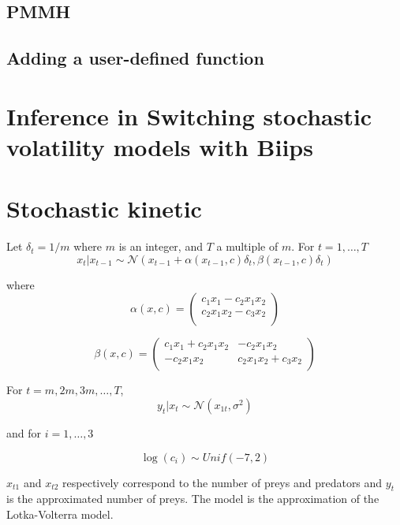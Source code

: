 \documentclass[article,shortnames]{jss}
\begin{document}
\subsection{PMMH}


\subsection{Adding a user-defined function}






\section{Inference in Switching stochastic volatility models with Biips}
\label{sec:switchingstochasticvolatility}



\section{Stochastic kinetic}
Let $\delta_t=1/m$ where $m$ is an integer, and $T$ a multiple of $m$.
For $t=1,\ldots,T$
$$ x_t|x_{t-1}\sim \mathcal N(x_{t-1}+\alpha(x_{t-1},c)\delta_t,\beta(x_{t-1},c)\delta_t)$$

where $$\alpha(x,c) = \left(
                  \begin{array}{c}
                    c_1x_1-c_2x_1x_2  \\
                    c_2x_1x_2-c_3x_2 \\
                  \end{array}
                \right)$$

     $$\beta(x,c) = \left(
                  \begin{array}{cc}
                    c_1x_1+c_2x_1x_2 & -c_2x_1x_2\\
                    -c_2x_1x_2 & c_2x_1x_2 + c_3x_2 \\
                  \end{array}
                \right)$$ 


For $t=m,2m,3m,\ldots,T$, 
$$y_t|x_t\sim \mathcal N(x_{1t},\sigma^2)$$

          
and for $i=1,\ldots,3$

$$ \log(c_i)\sim Unif(-7,2) $$


$x_{t1}$ and $x_{t2}$ respectively correspond to the number of preys and predators and $y_t$ is the approximated number of preys. The model is the approximation of the Lotka-Volterra model.
\end{document}
